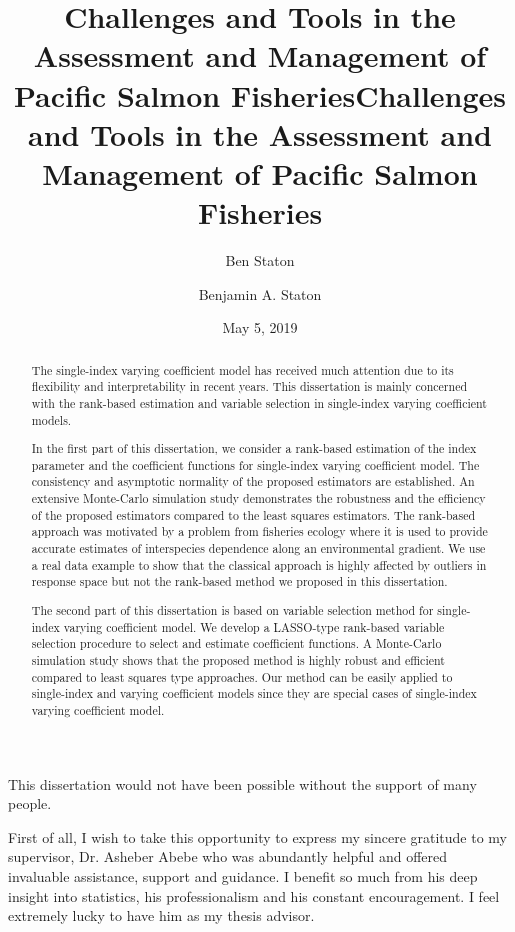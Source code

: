 \documentclass[12pt,]{book}
\title{Challenges and Tools in the Assessment and Management of Pacific Salmon
Fisheries}
\author{Ben Staton}
\date{}
\title{Challenges and Tools in the Assessment and Management of Pacific Salmon Fisheries}
\author{Benjamin A. Staton}
\date{May 5, 2019} %
\theoremstyle{definition}
\theoremstyle{definition}
\theoremstyle{definition}
\theoremstyle{remark}
\begin{document}
\maketitle

\begin{romanpages}      %

\TitlePage 

\doublespacing

\begin{abstract} 
The single-index varying coefficient model has received much attention due to its flexibility and interpretability in recent years. This dissertation is mainly concerned with the rank-based estimation and variable selection in single-index varying coefficient models. 

In the first part of this dissertation, we consider a rank-based estimation of the index parameter and the coefficient functions for single-index varying coefficient model. The consistency and asymptotic normality of the proposed estimators are established.  An extensive Monte-Carlo simulation study demonstrates the robustness and the efficiency of the proposed estimators compared to the least squares estimators. The rank-based approach was motivated by a problem from fisheries ecology where it is used to provide accurate estimates of interspecies dependence along an environmental gradient. We use a real data example to show that the classical approach is highly affected by outliers in response space but not the rank-based method we proposed in this dissertation.

The second part of this dissertation is based on variable selection method for single-index varying coefficient model. We develop a LASSO-type rank-based variable selection procedure to select and estimate coefficient functions. A Monte-Carlo simulation study shows that the proposed method is highly robust and efficient compared to least squares type approaches. Our method can be easily applied to single-index and varying coefficient models since they are special cases of single-index varying coefficient model.
\end{abstract}

\begin{acknowledgments}
This dissertation would not have been possible without the support of many people.

First of all, I wish to take this opportunity to express my sincere gratitude to my supervisor, Dr. Asheber Abebe who was abundantly helpful and offered invaluable assistance, support and guidance. I benefit so much from his deep insight into statistics, his professionalism and his constant encouragement. I feel extremely lucky to have him as my thesis advisor.


\end{acknowledgments}
\end{romanpages}
\end{document}
